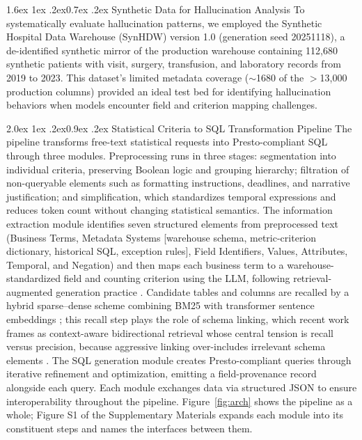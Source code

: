 \documentclass[10pt]{article}
\makeatletter
\renewcommand\subsection{\@startsection{subsection}{2}{\z@}%
  {2.0ex \@plus 1ex \@minus .2ex}{0.9ex \@plus .2ex}%
  {\normalfont\normalsize\bfseries}}
\renewcommand\subsubsection{\@startsection{subsubsection}{3}{\z@}%
  {1.6ex \@plus 1ex \@minus .2ex}{0.7ex \@plus .2ex}%
  {\normalfont\normalsize\itshape}}
\makeatother
\begin{document}
\subsubsection{Synthetic Data for Hallucination Analysis}
To systematically evaluate hallucination patterns, we employed the Synthetic Hospital Data Warehouse (SynHDW) version 1.0 (generation seed 20251118), a de-identified synthetic mirror of the production warehouse containing 112,680
synthetic patients with visit, surgery, transfusion, and laboratory records from
2019 to 2023. This dataset's limited metadata coverage ($\sim$1680 of the
$>$13,000 production columns) provided an ideal test bed for identifying
hallucination behaviors when models encounter field and criterion mapping
challenges.

\subsection{Statistical Criteria to SQL Transformation Pipeline}
The pipeline transforms free-text statistical requests into Presto-compliant SQL through three modules. Preprocessing runs in three stages: segmentation into individual criteria, preserving Boolean logic and grouping hierarchy; filtration of non-queryable elements such as formatting instructions, deadlines, and narrative justification; and simplification, which standardizes temporal expressions and reduces token count without changing statistical semantics. The information
extraction module identifies seven structured elements from preprocessed text
(Business Terms, Metadata Systems [warehouse schema, metric-criterion
dictionary, historical SQL, exception rules], Field Identifiers, Values,
Attributes, Temporal, and Negation) and then maps each business term to a
warehouse-standardized field and counting criterion using the LLM, following
retrieval-augmented generation practice \cite{lewis2020,finardi2024}. Candidate
tables and columns are recalled by a hybrid sparse--dense scheme combining BM25
\cite{bm252009} with transformer sentence embeddings
\cite{sbert2019,bert2019}; this recall step plays the
role of schema linking, which recent work frames as context-aware bidirectional
retrieval whose central tension is recall versus precision, because aggressive
linking over-includes irrelevant schema elements
\cite{schemalink2025,rslsql2024}. The SQL
generation module creates Presto-compliant queries through iterative refinement
and optimization, emitting a field-provenance record alongside each query. Each
module exchanges data via structured JSON to ensure interoperability throughout
the pipeline. Figure~\ref{fig:arch} shows the pipeline as a whole; Figure S1 of
the Supplementary Materials expands each module into its constituent steps and
names the interfaces between them.
\end{document}
